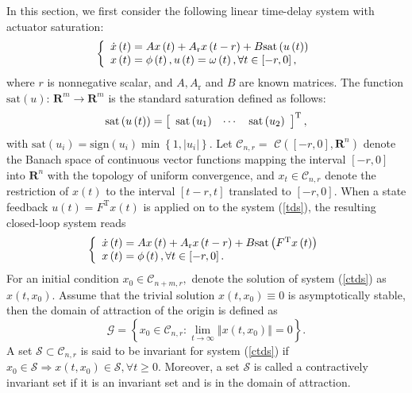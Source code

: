 \documentclass[9pt]{article}%
\begin{document}
In this section, we first consider the following linear time-delay system with
actuator saturation:%
\begin{equation}
\left \{
\begin{array}
[c]{l}%
\dot{x}\left(  t\right)  =Ax\left(  t\right)  +A_{\mathrm{r}}x\left(
t-r\right)  +B\mathrm{sat}\left(  u\left(  t\right)  \right) \\
x\left(  t\right)  =\phi \left(  t\right)  ,u\left(  t\right)  =\omega \left(
t\right)  ,\forall t\in \left[  -r,0\right]  ,
\end{array}
\right.  \label{tds}%
\end{equation}
where $r$ is nonnegative scalar, and $A,A_{\mathrm{r}}$ and $B$ are known
matrices. The function $\mathrm{sat}\left(  u\right)  $: $\mathbf{R}%
^{m}\rightarrow \mathbf{R}^{m}$ is the standard saturation defined as follows:%
\[
\mathrm{sat}\left(  u\left(  t\right)  \right)  =\left[
\begin{array}
[c]{ccc}%
\mathrm{sat}\left(  u_{1}\right)  & \cdots & \mathrm{sat}\left(  u_{2}\right)
\end{array}
\right]  ^{\mathrm{T}},
\]
with $\mathrm{sat}\left(  u_{i}\right)  =\mathrm{sign}\left(  u_{i}\right)
\min \left \{  1,\left \vert u_{i}\right \vert \right \}  .$ Let $\mathcal{C}%
_{n,r}=$ $\mathcal{C}\left(  \left[  -r,0\right]  ,\mathbf{R}^{n}\right)  $
denote the Banach space of continuous vector functions mapping the interval
$\left[  -r,0\right]  $ into $\mathbf{R}^{n}$ with the topology of uniform
convergence, and $x_{t}\in \mathcal{C}_{n,r}$ denote the restriction of
$x\left(  t\right)  $ to the interval $\left[  t-r,t\right]  $ translated to
$\left[  -r,0\right]  .$ When a state feedback $u\left(  t\right)
=F^{\mathrm{T}}x\left(  t\right)  $ is applied on to the system (\ref{tds}),
the resulting closed-loop system reads%
\begin{equation}
\left \{
\begin{array}
[c]{l}%
\dot{x}\left(  t\right)  =Ax\left(  t\right)  +A_{\mathrm{r}}x\left(
t-r\right)  +B\mathrm{sat}\left(  F^{\mathrm{T}}x\left(  t\right)  \right) \\
x\left(  t\right)  =\phi \left(  t\right)  ,\forall t\in \left[  -r,0\right]  .
\end{array}
\right.  \label{ctds}%
\end{equation}
For an initial condition $x_{0}\in \mathcal{C}_{n+m,r},$ denote the solution of
system (\ref{ctds}) as $x\left(  t,x_{0}\right)  .$ Assume that the trivial
solution $x\left(  t,x_{0}\right)  \equiv0$ is asymptotically stable, then the
domain of attraction of the origin is defined as%
\[
\mathcal{G}=\left \{  x_{0}\in \mathcal{C}_{n,r}:\underset{t\rightarrow \infty
}{\lim}\left \Vert x\left(  t,x_{0}\right)  \right \Vert =0\right \}  .
\]
A set $\mathcal{S}\subset \mathcal{C}_{n,r}$ is said to be invariant for system
(\ref{ctds}) if $x_{0}\in \mathcal{S}\Rightarrow x\left(  t,x_{0}\right)
\in \mathcal{S},\forall t\geq0.$ Moreover, a set $\mathcal{S}$ is called a
contractively invariant set if it is an invariant set and is in the domain of attraction.
\end{document}
